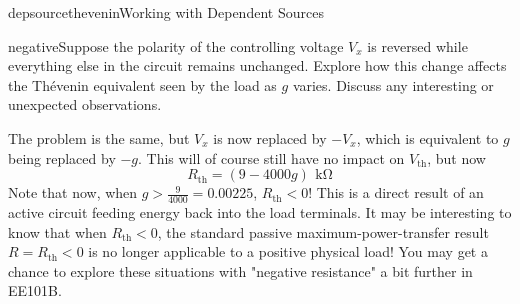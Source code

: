 \begin{mainquestion}{depsourcethevenin}{Working with Dependent Sources}
\begin{partquestion}{negative}{Suppose the polarity of the controlling voltage $V_x$ is reversed while everything else in the circuit remains unchanged. Explore how this change affects the Th\'evenin equivalent seen by the load as $g$ varies. Discuss any interesting or unexpected observations.}
\begin{answer}
The problem is the same, but $V_x$ is now replaced by $-V_x$, which is equivalent to $g$ being replaced by $-g$.  This will of course still have no impact on $V_{\mathrm{th}}$, but now 
\[
R_{\mathrm{th}}=(9-4000g)\,\qty{}{\kilo\ohm}
\]
Note that now, when $g>\frac{9}{4000}=0.00225$, $R_{\mathrm{th}} < 0$! This is a direct result of an active circuit feeding energy back into the load terminals.  It may be interesting to know that when $R_{\mathrm{th}} < 0$, the standard passive maximum-power-transfer result $R=R_{\mathrm{th}} < 0$ is no longer applicable to a positive physical load! You may get a chance to explore these situations with "negative resistance" a bit further in EE101B.
\end{answer}
\end{partquestion}
\end{mainquestion}